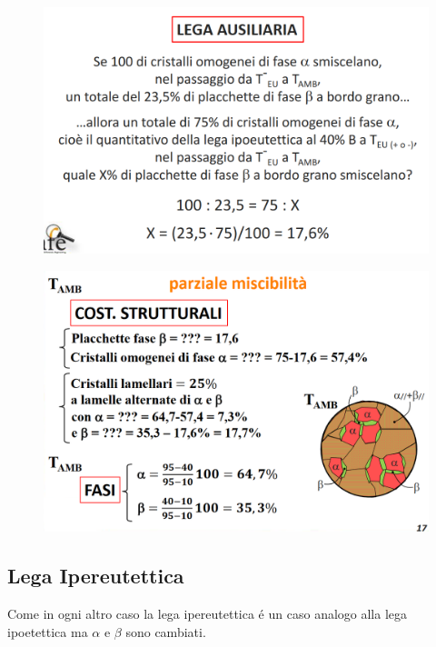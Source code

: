 \documentclass{article}
\begin{document}
{                \begin{figure}[h!]
                    \centering
                    \includegraphics[width=.8\linewidth]{Spiegazione per l'uso della lega ausiliaria per trovare smiscelamento in casi estranei.png}
                \end{figure}
                \begin{figure}[h!]
                    \centering
                    \includegraphics[width=.8\linewidth]{Calcolo per lega ipoeutettica fuori dal campo a TAMB con risposta.png}
                \end{figure}
        \subsection{Lega Ipereutettica}
            Come in ogni altro caso la lega ipereutettica \'e un caso analogo alla lega ipoetettica ma $\alpha$ e $\beta$ sono cambiati.
}
\end{document}
